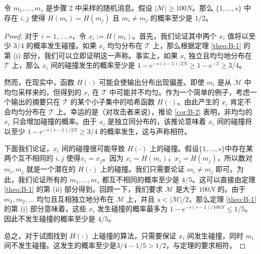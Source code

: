 \begin{lemma}\label{lemma:8-2}
令 $m_1,\dots,m_s$ 是步骤 2 中采样的随机消息。假设 $|\mathcal{M}|\geq100N$。那么 $\{1,\dots,s\}$ 中存在 $i,j$ 使得 $H(m_i)=H(m_j)$ 且 $m_i\neq m_j$ 的概率至少是 $1/2$。
\end{lemma}

\begin{proof}
对于 $i=1,\dots,s$，令 $x_i:=H(m_i)$。首先，我们论证其中两个 $x_i$ 值将以至少 $3/4$ 的概率发生碰撞。如果 $x_i$ 均匀分布在 $\mathcal{T}$ 上，那么根据定理 \ref{theo:B-1} 的第 (i) 部分，我们可以立即证明这一声称。事实上，如果 $x_i$ 独立且均匀地分布在 $\mathcal{T}$ 上，那么 $x_i$ 间的碰撞发生的概率至少是 $1-e^{-s(s-1)/2N}\geq1-e^{-2}\geq3/4$。

然而，在现实中，函数 $H(\cdot)$ 可能会使输出分布出现偏差。即使 $m_i$ 是从 $\mathcal{M}$ 中均匀采样来的，但得到的 $x_i$ 在 $\mathcal{T}$ 中可能并不均匀。作为一个简单的例子，考虑一个输出的摘要只在 $\mathcal{T}$ 的某个小子集中的哈希函数 $H(\cdot)$。由此产生的 $x_i$ 肯定不会均匀分布在 $\mathcal{T}$ 上。幸运的是（对攻击者来说），推论 \ref{cor:B-2} 表明，非均匀的 $x_i$ 只会增加碰撞的概率。由于 $x_i$ 是独立同分布的，该推论意味着 $x_i$ 间的碰撞将以至少 $1-e^{-s(s-1)/2N}\geq3/4$ 的概率发生，这与声称相符。

下面我们论证，$x_i$ 间的碰撞很可能导致 $H(\cdot)$ 上的碰撞。假设$\{1,\dots,s\}$中存在某两个互不相同的 $i,j$ 使得$x_i=x_j$。因为 $x_i=H(m_i)$，$x_j=H(m_j)$，所以数对 $m_i,m_j$ 就是一个潜在的 $H(\cdot)$ 上的碰撞。我们只需要论证 $m_i\neq m_j$ 即可。为此，我们论证所有的 $m_1,\dots,m_s$ 都互不相同的概率至少是 $4/5$。这可以直接由定理 \ref{theo:B-1} 的第 (ii) 部分得到。回顾一下，我们要求 $\mathcal{M}$ 是大于 $100N$ 的。由于 $m_1, m_2,\dots$ 均匀且互相独立地分布在 $\mathcal{M}$ 上，并且 $s<|\mathcal{M}|/2$，那么定理 \ref{theo:B-1} 的第 (i) 部分意味着，这些 $x_i$ 发生碰撞的概率最多为 $1-e^{-s(s-1)/100N}\leq 1/5$。因此不发生碰撞的概率至少是 $4/5$。

总之，对于试图找到 $H(\cdot)$ 上碰撞的算法，只需要保证 $x_i$ 间发生碰撞，同时 $m_i$ 间不发生碰撞。这发生的概率至少是$3/4-1/5>1/2$，与定理的要求相符。
\end{proof}

